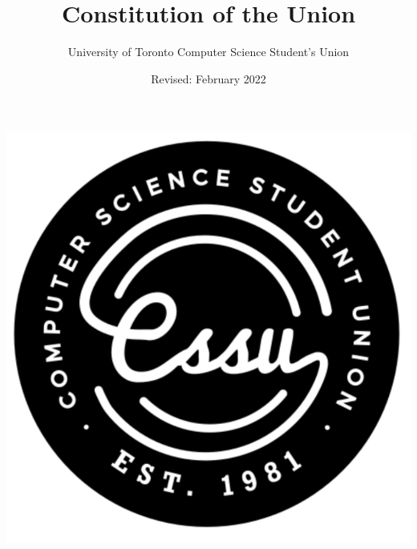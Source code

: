 \documentclass{article}
\begin{document}
\title{Constitution of the Union}
\author{University of Toronto Computer Science Student's Union}
\date{Revised: February 2022}
\maketitle
\includegraphics[width=\textwidth]{cssu-logo.PNG}
\newpage
\end{document}
